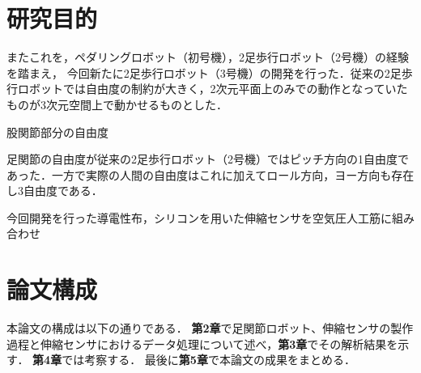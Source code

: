 \newpage

\section{研究目的}


またこれを，ペダリングロボット（初号機），2足歩行ロボット（2号機）の経験を踏まえ，
今回新たに2足歩行ロボット（3号機）の開発を行った．従来の2足歩行ロボットでは自由度の制約が大きく，2次元平面上のみでの動作となっていたものが3次元空間上で動かせるものとした．

股関節部分の自由度

足関節の自由度が従来の2足歩行ロボット（2号機）ではピッチ方向の1自由度であった．一方で実際の人間の自由度はこれに加えてロール方向，ヨー方向も存在し3自由度である．

今回開発を行った導電性布，シリコンを用いた伸縮センサを空気圧人工筋に組み合わせ


\section{論文構成}
本論文の構成は以下の通りである．
{\bf 第2章}で足関節ロボット、伸縮センサの製作過程と伸縮センサにおけるデータ処理について述べ，{\bf 第3章}でその解析結果を示す．
{\bf 第4章}では考察する． %
最後に{\bf 第5章}で本論文の成果をまとめる．
